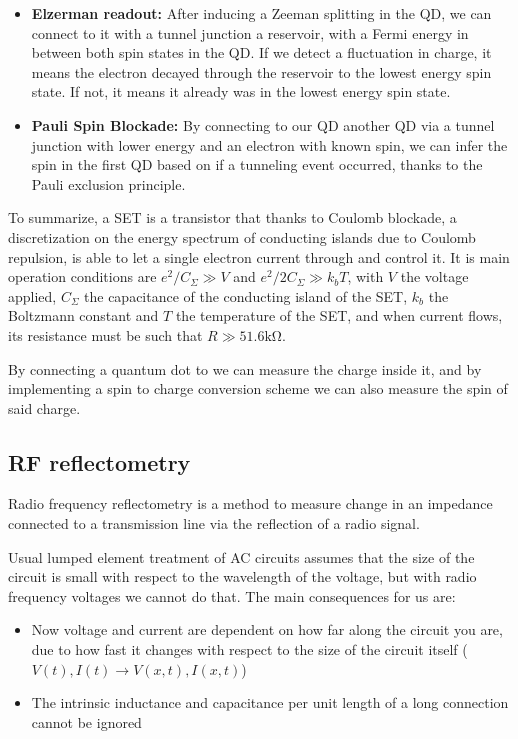 \documentclass[../main.tex]{subfiles}
\begin{document}
\begin{itemize}
    \item \textbf{Elzerman readout:} After inducing a Zeeman splitting in the
        QD, we can connect to it with a tunnel junction a reservoir,
         with a Fermi energy in between both spin states in the
        QD. If we detect a fluctuation in charge, it means the electron
        decayed through the reservoir to the lowest energy spin state. If
        not, it means it already was in the lowest energy spin state.
    \item \textbf{Pauli Spin Blockade:} By connecting to our QD another QD via a tunnel junction
        with lower energy and an electron with known spin, we can infer the
        spin in the first QD based on if a tunneling event occurred, thanks
        to the Pauli exclusion principle.
\end{itemize}

To summarize, a SET is a transistor that thanks to Coulomb blockade,
a discretization on the energy spectrum of conducting islands due to
Coulomb repulsion, is able to let a single electron current through and
control it. It is main operation conditions are \(e^2/C_{\Sigma} \gg V\)
and \(e^2/2C_{\Sigma} \gg k_{b}T\), with \(V\) the voltage applied,
\(C_{\Sigma}\) the capacitance of the conducting island of the SET, \(k_{b}\)
the Boltzmann constant and \(T\) the temperature of the SET, and when current
flows, its resistance must be such that \(R \gg 51.6\unit{\kilo\ohm}\).

By connecting a quantum dot to we can measure the charge inside it, and
by implementing a spin to charge conversion scheme we can also measure
the spin of said charge.

\newpage
\subsection{RF reflectometry}
\label{subsec:RFRef}
Radio frequency reflectometry is a method to measure change in an impedance
connected to a transmission line via the reflection of a radio signal.

Usual lumped element treatment of AC circuits assumes that the size of the
circuit is small with respect to the wavelength of the voltage,
but with radio frequency voltages we cannot do that. The main consequences for
us are:
\begin{itemize}
    \item Now voltage and current are dependent on how far along the circuit
    you are, due to how fast it changes with respect to the size of the circuit
    itself (\(V(t), I(t) \rightarrow V(x, t), I(x, t)\))
\item The intrinsic inductance and capacitance per unit length of a long
    connection cannot be ignored
\end{itemize}
\end{document}
